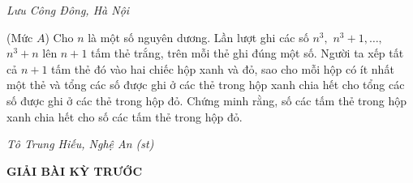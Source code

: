 \begin{multicols}{2}
\begin{figure}[H]
		\vspace*{-10pt}
	\end{figure}
	\begin{flushright}
		\textit{\small Lưu Công Đông, Hà Nội}
	\end{flushright}
	{\color{thachthuctoanhoc}{\usefont{T5}{qag}{b}{n} P700.}}
	(Mức $A$) Cho $n$ là một số nguyên dương. Lần lượt ghi các số $n^3,$ $n^3+1,\ldots,$ $n^3+n$ lên $n+1$ tấm thẻ trắng, trên mỗi thẻ ghi đúng một số. Người ta xếp tất cả $n+1$ tấm thẻ đó vào hai chiếc hộp xanh và đỏ, sao cho mỗi hộp có ít nhất một thẻ và  tổng các số được ghi ở các thẻ trong hộp xanh chia hết cho tổng các số được ghi ở các thẻ trong hộp đỏ. Chứng minh rằng, số các tấm thẻ trong hộp xanh chia hết cho số các tấm thẻ trong hộp đỏ.
	\begin{flushright}
		\textit{\small Tô Trung Hiếu, Nghệ An (st)}
	\end{flushright}
\end{multicols}
\newpage
\centerline{{\large{\textbf{\color{thachthuctoanhoc}GIẢI BÀI KỲ TRƯỚC}}}}
\vspace*{-5pt}
